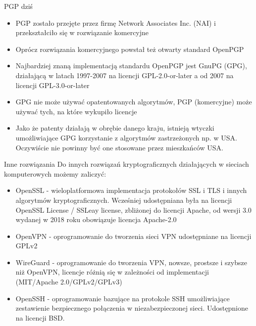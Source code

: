 \documentclass[aspectratio=169]{beamer}
\begin{document}
\begin{frame}{PGP dziś}
    \begin{itemize}
        \item PGP zostało przejęte przez firmę Network Associates Inc. (NAI) i przekształciło się w rozwiązanie komercyjne
        \item Oprócz rozwiązania komercyjnego powstał też otwarty standard OpenPGP
        \item Najbardziej znaną implementacją standardu OpenPGP jest GnuPG (GPG), działającą w latach 1997-2007 na licencji GPL-2.0-or-later a od 2007 na licencji GPL-3.0-or-later
        \item GPG nie może używać opatentowanych algorytmów, PGP (komercyjne) może używać tych, na które wykupiło licencje
        \item Jako że patenty działają w obrębie danego kraju, istnieją wtyczki umożliwiające GPG korzystanie z algorytmów zastrzeżonych np. w USA. Oczywiście nie powinny być one stosowane przez mieszkańców USA.
    \end{itemize}
\end{frame}

\begin{frame}{Inne rozwiązania}
    Do innych rozwiązań kryptograficznych działających w sieciach komputerowych możemy zaliczyć:
    \begin{itemize}
        \item OpenSSL - wieloplatformowa implementacja protokołów SSL i TLS i innych algorytmów kryptograficznych. Wcześniej udostępniana była na licencji OpenSSL License / SSLeay license, zbliżonej do licencji Apache, od wersji 3.0 wydanej w 2018 roku obowiązuje licencja Apache-2.0
        \item OpenVPN - oprogramowanie do tworzenia sieci VPN udostępniane na licencji GPLv2
        \item WireGuard - oprogramowanie do tworzenia VPN, nowsze, prostsze i szybsze niż OpenVPN, licencje różnią się w zależności od implementacji (MIT/Apache 2.0/GPLv2/GPLv3)
        \item OpenSSH - oprogramowanie bazujące na protokole SSH umożliwiające zestawienie bezpiecznego połączenia w niezabezpieczonej sieci. Udostępnione na licencji BSD.
    \end{itemize}
\end{frame}
\end{document}

